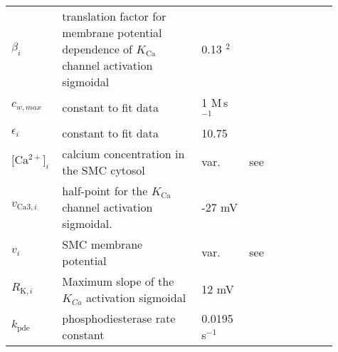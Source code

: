 \documentclass[fleqn]{report}
\numberwithin{equation}{section}
\numberwithin{equation}{section}
\newcommand{\LArg}{\text{L-Arg}}
\newcommand{\Otwo}{\text{O$_2$}}
\newcommand{\Cai}{\text{[Ca$^{2+}]_i$}}
\newcommand{\uMpers}{\textmu M\,s$^{-1}$}
\newcommand{\n}{$^{-1}$}
\begin{document}
\begin{table}[h!]
\begin{tabular}{ p{0.1\linewidth}  >{\footnotesize} p{0.41\linewidth}  >{\footnotesize} p{0.14\linewidth} >{\footnotesize} p{0.26\linewidth} }
						$ \beta_i $ 			& translation factor for membrane potential dependence of $ K_{\text{Ca}} $ channel activation sigmoidal & 0.13 \uM$^2$ & \citep{Koenigsberger2006} \\ 
						$ c_{w,max} $ 			& constant to fit data & 1 \uMpers & \citep{Stockand1996}\\ 
						$ \epsilon_i$			& constant to fit data 				& 10.75 \uM 	&  \citep{Stockand1996} \\ 
						$ \Cai $ 				& calcium concentration in the SMC cytosol & var. 		& see \citet{Dormanns2014} \\
						$ v_{\text{Ca}3,i} $ 			& half-point for the $ K_{\text{Ca}} $ channel activation sigmoidal. & -27 mV & \citep{Koenigsberger2006}\\ 
						$ v_i $ 				& SMC membrane potential 		& var. 	& see \citep{Dormanns2014} \\
						$ R_{\text{K},i}  $ 				& Maximum slope of the $K_{Ca}$ activation sigmoidal & 12 mV & \citep{Koenigsberger2006}\\ 
						$ k_{\text{pde}} $		& phosphodiesterase rate constant & 0.0195 s\n & \citep{Yang2005} \\
						\hline
					\end{tabular}
				\end{table}	
						
\end{document}
